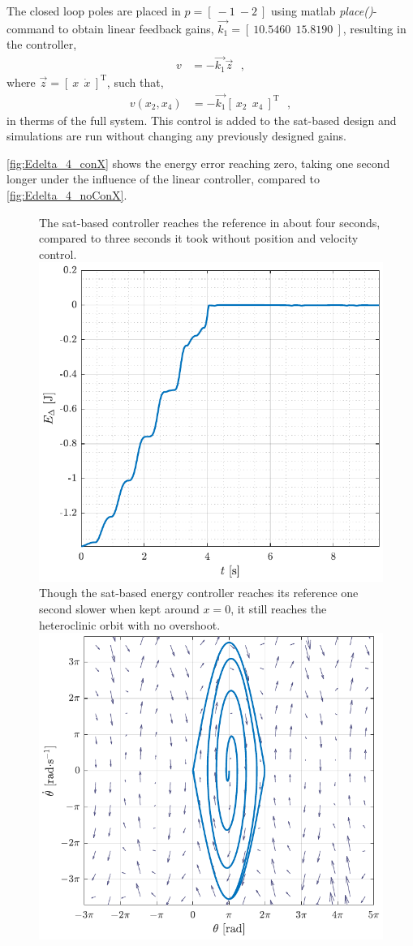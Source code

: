 %
The closed loop poles are placed in $p = [\ -1\ -2 \ ] $ using matlab \textit{place()}-command to obtain linear feedback gains, $\vec{k_1} = [\ 10.5460\ \ 15.8190\ ]$, resulting in the controller,
\begin{align}
  v &= -\vec{k_1} \vec{z} \ \ \ ,  \label{eq:linearFeedbackSimple} 
\end{align}
where $\vec{z} = [\ x\ \ \dot{x}\ ]^\mathrm{T}$, such that,
\begin{align}
  v(x_2,x_4) &= -\vec{k_1}  [\ x_2\ \ x_4\ ]^\mathrm{T} \ \ \ ,    \label{eq:linearFeedbackSimple2} 
\end{align}
in therms of the full system. This control is added to the sat-based design and simulations are run without changing any previously designed gains.

\autoref{fig:Edelta_4_conX} shows the energy error reaching zero, taking one second longer under the influence of the linear controller, compared to \autoref{fig:Edelta_4_noConX}.
%
\begin{figure}[H]
  \hspace{-10pt}
  \captionbox 
  {
    The sat-based controller reaches the reference in about four seconds, compared to three seconds it took without position and velocity control.
    \label{fig:Edelta_4_conX}
  }
  {
    \hspace{-1cm}
    \includegraphics[width=.448\textwidth]{figures/Edelta_4_conX}
  }
  \hspace{20pt}
  \captionbox 
  {
    Though the sat-based energy controller reaches its reference one second slower when kept around $x = 0$, it still reaches the heteroclinic orbit with no overshoot.
    \label{fig:phase_4_conX}
  }
  {
    \hspace{-1cm}
    \includegraphics[width=.46\textwidth]{figures/phase_4_conX}
  }
\end{figure}
